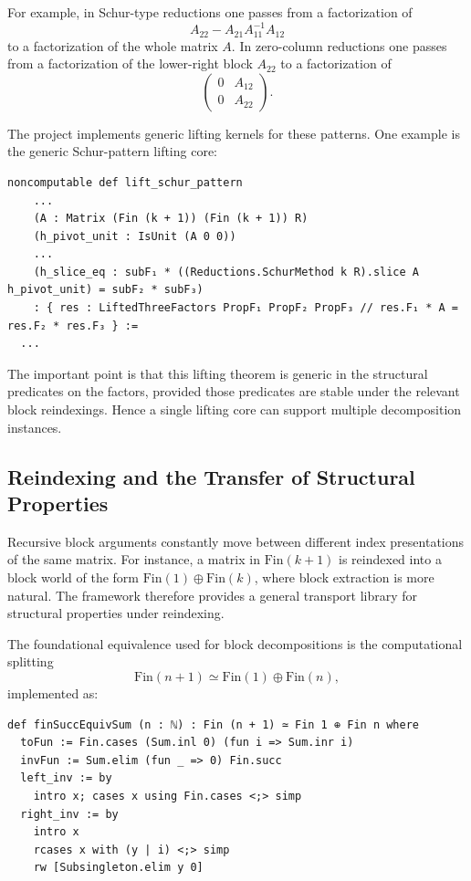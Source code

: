 \documentclass[pdflatex,sn-mathphys-num]{sn-jnl}%
\theoremstyle{thmstyleone}%
\theoremstyle{thmstyletwo}%
\theoremstyle{thmstylethree}%
\begin{document}
For example, in Schur-type reductions one passes from a factorization of
\[
A_{22} - A_{21}A_{11}^{-1}A_{12}
\]
to a factorization of the whole matrix \(A\).  In zero-column reductions one passes from a factorization of the lower-right block \(A_{22}\) to a factorization of
\[
\begin{pmatrix}
0 & A_{12}\\
0 & A_{22}
\end{pmatrix}.
\]

The project implements generic lifting kernels for these patterns.  One example is the generic Schur-pattern lifting core:

\begin{lstlisting}
noncomputable def lift_schur_pattern
    ...
    (A : Matrix (Fin (k + 1)) (Fin (k + 1)) R)
    (h_pivot_unit : IsUnit (A 0 0))
    ...
    (h_slice_eq : subF₁ * ((Reductions.SchurMethod k R).slice A h_pivot_unit) = subF₂ * subF₃)
    : { res : LiftedThreeFactors PropF₁ PropF₂ PropF₃ // res.F₁ * A = res.F₂ * res.F₃ } :=
  ...
\end{lstlisting}

The important point is that this lifting theorem is generic in the structural predicates on the factors, provided those predicates are stable under the relevant block reindexings.  Hence a single lifting core can support multiple decomposition instances.

\subsection{Reindexing and the Transfer of Structural Properties}

Recursive block arguments constantly move between different index presentations of the same matrix.  For instance, a matrix in \(\mathrm{Fin}(k+1)\) is reindexed into a block world of the form \(\mathrm{Fin}(1)\oplus \mathrm{Fin}(k)\), where block extraction is more natural.  The framework therefore provides a general transport library for structural properties under reindexing.

The foundational equivalence used for block decompositions is the computational splitting
\[
\mathrm{Fin}(n+1) \simeq \mathrm{Fin}(1)\oplus \mathrm{Fin}(n),
\]
implemented as:

\begin{lstlisting}
def finSuccEquivSum (n : ℕ) : Fin (n + 1) ≃ Fin 1 ⊕ Fin n where
  toFun := Fin.cases (Sum.inl 0) (fun i => Sum.inr i)
  invFun := Sum.elim (fun _ => 0) Fin.succ
  left_inv := by
    intro x; cases x using Fin.cases <;> simp
  right_inv := by
    intro x
    rcases x with (y | i) <;> simp
    rw [Subsingleton.elim y 0]
\end{lstlisting}
\end{document}
